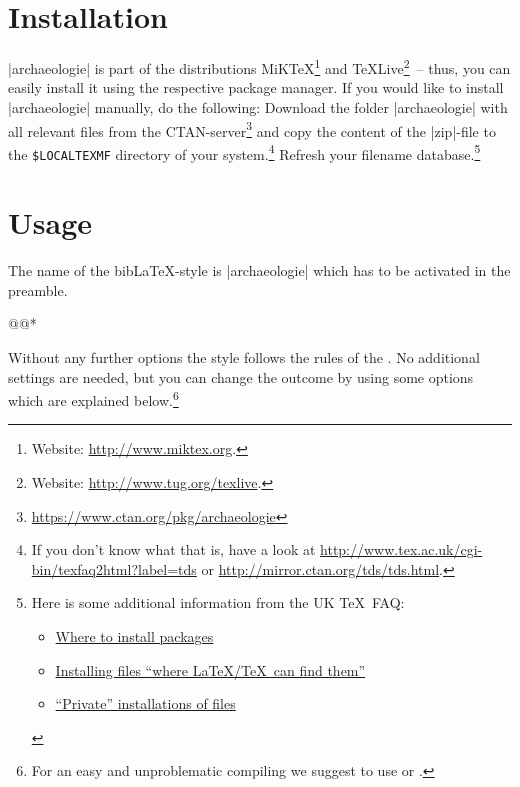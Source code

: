 \documentclass[a4paper,
10pt,
greek,
french,
spanish,
italian,
ngerman,
english
]{ltxdoc}
\begin{document}
\section{Installation}
|archaeologie| is part of the distributions MiK\TeX \footnote{Website: \url{http://www.miktex.org}.} 
and \TeX Live\footnote{Website: \url{http://www.tug.org/texlive}.}~-- thus, you
can easily install it using the respective package manager. 
If you would like to
install |archaeologie| manually, do the following:
Download the folder |archaeologie| with all relevant files from the CTAN-server\footnote{\url{https://www.ctan.org/pkg/archaeologie}} and copy the content of the |zip|-file to the \texttt{\$LOCALTEXMF} directory of
 your system.\footnote{If you don't know what that is, have a look at
\url{http://www.tex.ac.uk/cgi-bin/texfaq2html?label=tds} or 
\url{http://mirror.ctan.org/tds/tds.html}.} 
Refresh your filename database.\footnote{ 
Here is some additional information from the UK \TeX\ FAQ:
\begin{itemize}[nosep,after=\vspace{-\baselineskip} ]
  \item \href{%
    http://www.tex.ac.uk/cgi-bin/texfaq2html?label=install-where}{%
    Where to install packages}
  \item \href{%
    http://www.tex.ac.uk/cgi-bin/texfaq2html?label=inst-wlcf}{%
    Installing files \enquote{where \LaTeX /TeX\ can find them}}
  \item \href{%
    http://www.tex.ac.uk/cgi-bin/texfaq2html?label=privinst}{%
    \enquote{Private} installations of files}
\end{itemize}
}

\section{Usage}
   The name of the bib\LaTeX-style is  |archaeologie| which has to be activated in the preamble. 

\begin{code}
\usepackage[style=archaeologie,%
          *@@*]{biblatex}
@@*
\end{code}

Without any further options the style follows the rules of the \DAI. 
No additional settings are needed,
but you can change the outcome by using some options which are explained below.\footnote{For an easy and unproblematic compiling we suggest to use  or  .}
\end{document}
